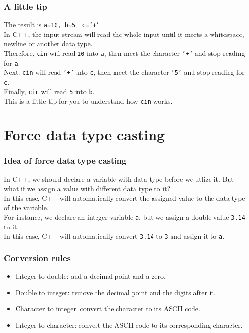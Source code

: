 \documentclass[xcolor=dvipsnames]{beamer}
\begin{document}
    \begin{frame}
        \frametitle{A little tip}
        The result is \texttt{a=10, b=5, c='+'}\\
        In C++, the input stream will read the whole input until it meets a whitespace, newline or another data type.\\
        Therefore, \texttt{cin} will read \texttt{10} into \texttt{a}, then meet the character \texttt{'+'} and stop reading for \texttt{a}.\\
        Next, \texttt{cin} will read \texttt{'+'} into \texttt{c}, then meet the character \texttt{'5'} and stop reading for \texttt{c}.\\
        Finally, \texttt{cin} will read \texttt{5} into \texttt{b}.\\
        This is a little tip for you to understand how \texttt{cin} works.
    \end{frame}

    \section{Force data type casting}
    \begin{frame}
        \frametitle{Idea of force data type casting}
        In C++, we should declare a variable with data type before we utlize it. But what if we assign a value with different data type to it?\\
        In this case, C++ will automatically convert the assigned value to the data type of the variable.\\
        For instance, we declare an integer variable \texttt{a}, but we assign a double value \texttt{3.14} to it.\\
        In this case, C++ will automatically convert \texttt{3.14} to \texttt{3} and assign it to \texttt{a}.\\
    \end{frame}
    \begin{frame}
        \frametitle{Conversion rules}
        \begin{itemize}
            \item Integer to double: add a decimal point and a zero.\\
            \item Double to integer: remove the decimal point and the digits after it.\\
            \item Character to integer: convert the character to its ASCII code.\\
            \item Integer to character: convert the ASCII code to its corresponding character.
        \end{itemize}
    \end{frame}
\end{document}
